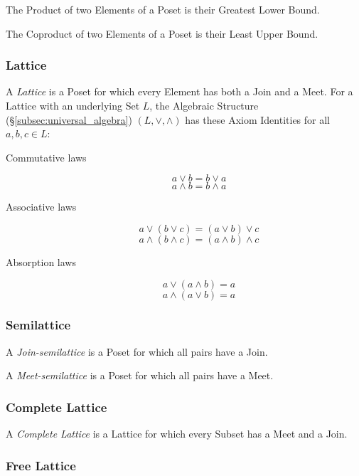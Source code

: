 \documentclass{article}
\begin{document}
The Product of two Elements of a Poset is their Greatest Lower Bound.

The Coproduct of two Elements of a Poset is their Least Upper Bound.



\subsubsection{Lattice}\label{subsec:lattice}

A \emph{Lattice} is a Poset for which every Element has both a Join
and a Meet. For a Lattice with an underlying Set $L$, the Algebraic
Structure (\S\ref{subsec:universal_algebra}) $(L, \vee, \wedge)$ has
these Axiom Identities for all $a,b,c \in L$:
\begin{description}
\item[Commutative laws]
\[
    a \vee b = b \vee a
\] \[
    a \wedge b = b \wedge a
\]
\item[Associative laws]
\[
    a \vee (b \vee c) = (a \vee b) \vee c
\] \[
    a \wedge (b \wedge c) = (a \wedge b) \wedge c
\]
\item[Absorption laws]
\[
    a \vee (a \wedge b) = a
\] \[
    a \wedge (a \vee b) = a
\]
\end{description}



\subsubsection{Semilattice}\label{subsec:semilattice}

A \emph{Join-semilattice} is a Poset for which all pairs have a Join.

A \emph{Meet-semilattice} is a Poset for which all pairs have a Meet.



\subsubsection{Complete Lattice}\label{subsec:complete_lattice}

A \emph{Complete Lattice} is a Lattice for which every Subset has a
Meet and a Join.



\subsubsection{Free Lattice}
\end{document}
